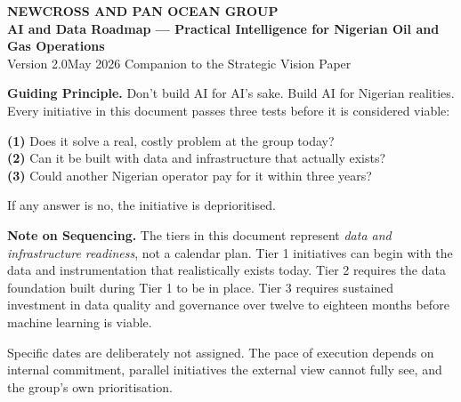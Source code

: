 \documentclass[10pt]{article}
\newcommand{\bigspacer}{\vspace{16pt}}
\begin{document}
\begin{center}
  \vspace*{0.1cm}
  {\color{primary}\LARGE\bfseries NEWCROSS AND PAN OCEAN GROUP}\\[6pt]
  {\color{primary}\large\bfseries AI and Data Roadmap --- Practical Intelligence
   for Nigerian Oil and Gas Operations}\\[10pt]
  {\color{darkgrey}\normalsize Version 2.0\quad\textbar\quad May 2026\quad\textbar\quad
   Companion to the Strategic Vision Paper}
\end{center}

\bigspacer

\noindent\colorbox{primary!8}{%
\begin{minipage}{\dimexpr\textwidth-2\fboxsep}
  \vspace{6pt}
  \textbf{\color{primary}Guiding Principle.}\quad
  Don't build AI for AI's sake. Build AI for Nigerian realities. Every initiative
  in this document passes three tests before it is considered viable:

  \vspace{4pt}
  \textbf{(1)} Does it solve a real, costly problem at the group today? \\
  \textbf{(2)} Can it be built with data and infrastructure that actually exists? \\
  \textbf{(3)} Could another Nigerian operator pay for it within three years?

  \vspace{4pt}
  If any answer is no, the initiative is deprioritised.
  \vspace{6pt}
\end{minipage}}

\bigspacer

\noindent\colorbox{accent!8}{%
\begin{minipage}{\dimexpr\textwidth-2\fboxsep}
  \vspace{6pt}
  \textbf{\color{accent}Note on Sequencing.}\quad
  The tiers in this document represent \emph{data and infrastructure readiness},
  not a calendar plan. Tier 1 initiatives can begin with the data and instrumentation
  that realistically exists today. Tier 2 requires the data foundation built during
  Tier 1 to be in place. Tier 3 requires sustained investment in data quality and
  governance over twelve to eighteen months before machine learning is viable.

  \vspace{4pt}
  Specific dates are deliberately not assigned. The pace of execution depends on
  internal commitment, parallel initiatives the external view cannot fully see,
  and the group's own prioritisation.
  \vspace{6pt}
\end{minipage}}
\end{document}
